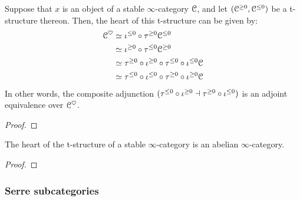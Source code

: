                \begin{corollary} \label{coro: short_exact_sequences_and_truncations}
                    Suppose that $x$ is an object of a stable $\infty$-category $\mathcal{C}$, and let $(\mathcal{C}^{\geq 0}, \mathcal{C}^{\leq 0})$ be a t-structure thereon. Then, the heart of this t-structure can be given by:
                        $$
                            \begin{aligned}
                                \mathcal{C}^{\heartsuit} & \simeq \iota^{\leq 0} \circ \tau^{\geq 0} \mathcal{C}^{\leq 0}
                                \\
                                & \simeq \iota^{\geq 0} \circ \tau^{\leq 0} \mathcal{C}^{\geq 0} 
                                \\
                                & \simeq \tau^{\geq 0} \circ \iota^{\geq 0} \circ \tau^{\leq 0} \circ \iota^{\leq 0} \mathcal{C} 
                                \\
                                & \simeq \tau^{\leq 0} \circ \iota^{\leq 0} \circ \tau^{\geq 0} \circ \iota^{\geq 0} \mathcal{C}
                            \end{aligned}
                        $$
                    In other words, the composite adjunction $(\tau^{\leq 0} \circ \iota^{\geq 0} \dashv \tau^{\geq 0} \circ \iota^{\leq 0})$ is an adjoint equivalence over $\mathcal{C}^{\heartsuit}$. 
                \end{corollary}
                    \begin{proof}
                        
                    \end{proof}
                
                \begin{theorem} \label{theorem: hearts_are_abelian} 
                    The heart of the t-structure of a stable $\infty$-category is an abelian $\infty$-category.
                \end{theorem}
                    \begin{proof}
                        
                    \end{proof}
                    
            \subsubsection{Serre subcategories}
        
